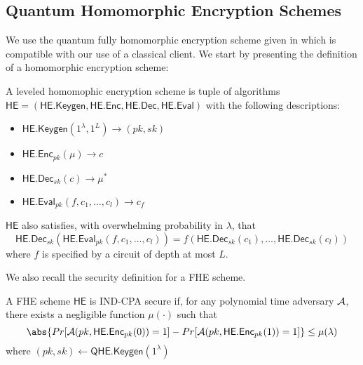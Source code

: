 \subsection{Quantum Homomorphic Encryption Schemes}


\def\QHE{\mathsf{QHE}}
\def\QGen{\mathsf{QHE.Keygen}}
\def\QEnc{\mathsf{QHE.Enc}}
\def\QEval{\mathsf{QHE.Eval}}
\def\QDec{\mathsf{QHE.Dec}}

We use the quantum fully homomorphic encryption scheme given in \cite{mahadev_qfhe} which is compatible with our use of a classical client. We start by presenting the definition of a homomorphic encryption scheme:
\begin{definition}
	A leveled homomophic encryption scheme is tuple of algorithms \linebreak $\mathsf{HE}=(\mathsf{HE.Keygen}, \mathsf{HE.Enc}, \mathsf{HE.Dec}, \mathsf{HE.Eval})$ with the following descriptions:
	\begin{itemize}
		\item $\mathsf{HE.Keygen}(1^\lambda, 1^L)\rightarrow(pk, sk)$
		\item $\mathsf{HE.Enc}_{pk}(\mu)\rightarrow c$
		\item $\mathsf{HE.Dec}_{sk}(c)\rightarrow \mu^*$
		\item $\mathsf{HE.Eval}_{pk}(f, c_1, \ldots, c_l)\rightarrow c_f$
	\end{itemize}
\end{definition}

$\mathsf{HE}$ also satisfies, with overwhelming probability in $\lambda$, that
$$\mathsf{HE.Dec}_{sk}(\mathsf{HE.Eval}_{pk}(f, c_1, \ldots, c_l))=f(\mathsf{HE.Dec}_{sk}(c_1),\ldots,\mathsf{HE.Dec}_{sk}(c_l))$$
where $f$ is specified by a circuit of depth at most $L$.



We also recall the security definition for a FHE scheme.

\begin{definition}
	A FHE scheme $\mathsf{HE}$ is IND-CPA secure if, for any polynomial time adversary $\mathcal{A}$, there exists a negligible function $\mu(\cdot)$ such that
	$$\abs{Pr[\cA(pk, \mathsf{HE.Enc}_{pk}(0))=1]-Pr[\cA(pk, \mathsf{HE.Enc}_{pk}(1))=1]}\leq\mu(\lambda)$$
	where $(pk, sk)\leftarrow\mathsf{QHE.Keygen}(1^\lambda)$
\end{definition}

